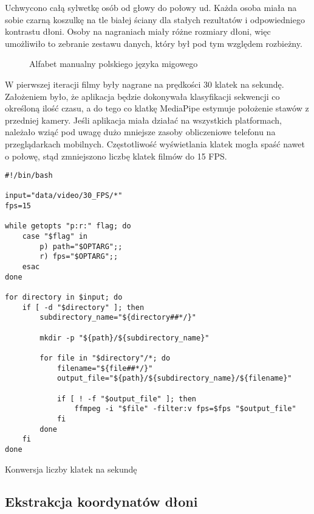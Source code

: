 Uchwycono całą sylwetkę osób od głowy do połowy ud. Każda osoba miała na sobie czarną koszulkę na tle białej ściany dla stałych rezultatów i odpowiedniego kontrastu dłoni. Osoby na nagraniach miały różne rozmiary dłoni, więc umożliwiło to zebranie zestawu danych, który był pod tym względem rozbieżny.

\begin{figure}[H]
    \centering
    \colorbox{background}{}
    \caption{Alfabet manualny polskiego języka migowego}
    \label{fig:pjm-alphabet}
\end{figure}

W pierwszej iteracji filmy były nagrane na prędkości 30 klatek na sekundę. Założeniem było, że aplikacja będzie dokonywała klasyfikacji sekwencji co określoną ilość czasu, a do tego co klatkę MediaPipe estymuje położenie stawów z przedniej kamery. Jeśli aplikacja miała działać na wszystkich platformach, należało wziąć pod uwagę dużo mniejsze zasoby obliczeniowe telefonu na przeglądarkach mobilnych. Częstotliwość wyświetlania klatek mogła spaść nawet o połowę, stąd zmniejszono liczbę klatek filmów do 15 FPS.

\begin{listing}[H]
    \color{white}
    \begin{verbatim}
#!/bin/bash

input="data/video/30_FPS/*"
fps=15

while getopts "p:r:" flag; do
    case "$flag" in
        p) path="$OPTARG";;
        r) fps="$OPTARG";;
    esac
done

for directory in $input; do
    if [ -d "$directory" ]; then
        subdirectory_name="${directory##*/}"

        mkdir -p "${path}/${subdirectory_name}"

        for file in "$directory"/*; do
            filename="${file##*/}"
            output_file="${path}/${subdirectory_name}/${filename}"

            if [ ! -f "$output_file" ]; then
                ffmpeg -i "$file" -filter:v fps=$fps "$output_file"
            fi
        done
    fi
done
    \end{verbatim}
    \caption{Konwersja liczby klatek na sekundę}
    \label{lst:frame-rate-conversion}
\end{listing}

\subsection{Ekstrakcja koordynatów dłoni}
\label{subsec:keypoint-extraction}

